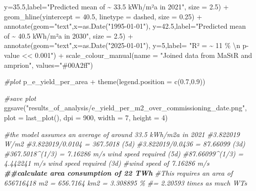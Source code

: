 \documentclass[a4paper,11pt]{article}
\newenvironment{Shaded}{\begin{snugshade}}{\end{snugshade}}
\newcommand{\AttributeTok}[1]{\textcolor[rgb]{0.77,0.63,0.00}{#1}}
\newcommand{\CommentTok}[1]{\textcolor[rgb]{0.56,0.35,0.01}{\textit{#1}}}
\newcommand{\DecValTok}[1]{\textcolor[rgb]{0.00,0.00,0.81}{#1}}
\newcommand{\DocumentationTok}[1]{\textcolor[rgb]{0.56,0.35,0.01}{\textbf{\textit{#1}}}}
\newcommand{\FloatTok}[1]{\textcolor[rgb]{0.00,0.00,0.81}{#1}}
\newcommand{\FunctionTok}[1]{\textcolor[rgb]{0.00,0.00,0.00}{#1}}
\newcommand{\NormalTok}[1]{#1}
\newcommand{\SpecialCharTok}[1]{\textcolor[rgb]{0.00,0.00,0.00}{#1}}
\newcommand{\StringTok}[1]{\textcolor[rgb]{0.31,0.60,0.02}{#1}}
\begin{document}
\begin{Shaded}
\begin{Highlighting}[]
           \AttributeTok{y=}\FloatTok{35.5}\NormalTok{,}\AttributeTok{label=}\StringTok{"Predicted mean of  \textasciitilde{} 33.5 kWh/m²a in 2021"}\NormalTok{, }
           \AttributeTok{size =} \FloatTok{2.5}\NormalTok{) }\SpecialCharTok{+}
  \FunctionTok{geom\_hline}\NormalTok{(}\AttributeTok{yintercept =} \FloatTok{40.5}\NormalTok{, }\AttributeTok{linetype =} \StringTok{\textquotesingle{}dashed\textquotesingle{}}\NormalTok{, }\AttributeTok{size =} \FloatTok{0.25}\NormalTok{) }\SpecialCharTok{+}
  \FunctionTok{annotate}\NormalTok{(}\AttributeTok{geom=}\StringTok{"text"}\NormalTok{,}\AttributeTok{x=}\FunctionTok{as.Date}\NormalTok{(}\StringTok{"1995{-}01{-}01"}\NormalTok{),}
           \AttributeTok{y=}\FloatTok{42.5}\NormalTok{,}\AttributeTok{label=}\StringTok{"Predicted mean of \textasciitilde{} 40.5 kWh/m²a in 2030"}\NormalTok{,}
           \AttributeTok{size =} \FloatTok{2.5}\NormalTok{) }\SpecialCharTok{+}
  \FunctionTok{annotate}\NormalTok{(}\AttributeTok{geom=}\StringTok{"text"}\NormalTok{,}\AttributeTok{x=}\FunctionTok{as.Date}\NormalTok{(}\StringTok{"2025{-}01{-}01"}\NormalTok{),}
           \AttributeTok{y=}\DecValTok{5}\NormalTok{,}\AttributeTok{label=} \StringTok{"R² = \textasciitilde{} 11 \% }\SpecialCharTok{\textbackslash{}n}\StringTok{ p{-}value \textless{}\textless{} 0.001"}\NormalTok{) }\SpecialCharTok{+}
  \FunctionTok{scale\_colour\_manual}\NormalTok{(}\AttributeTok{name =} \StringTok{"Joined data from MaStR and amprion"}\NormalTok{, }
                      \AttributeTok{values=}\StringTok{"\#00A2ff"}\NormalTok{)}

\CommentTok{\#plot}
\NormalTok{p\_e\_yield\_per\_area }\SpecialCharTok{+}  \FunctionTok{theme}\NormalTok{(}\AttributeTok{legend.position =} \FunctionTok{c}\NormalTok{(}\FloatTok{0.7}\NormalTok{,}\FloatTok{0.9}\NormalTok{))}

\CommentTok{\#save plot}
\FunctionTok{ggsave}\NormalTok{(}\StringTok{"results\_of\_analysis/e\_yield\_per\_m2\_over\_commissioning\_date.png"}\NormalTok{,}
       \AttributeTok{plot =} \FunctionTok{last\_plot}\NormalTok{(),}
       \AttributeTok{dpi =} \DecValTok{900}\NormalTok{,}
       \AttributeTok{width =} \DecValTok{7}\NormalTok{,}
       \AttributeTok{height =} \DecValTok{4}\NormalTok{)}


\CommentTok{\#the model assumes an average of around 33.5 kWh/m2a in 2021}
\CommentTok{\#3.822019 W/m2}
\CommentTok{\#3.822019/0.0104 = 367.5018 (5d)}
\CommentTok{\#3.822019/0.0436 = 87.66099 (3d)}
\CommentTok{\#367.5018\^{}(1/3) = 7.16286 m/s wind speed required (5d)}
\CommentTok{\#87.66099\^{}(1/3) = 4.442241 m/s wind speed required (3d)}
\CommentTok{\#wind speed of 7.16286 m/s}
\DocumentationTok{\#\#calculate area consumption of 22 TWh}
\CommentTok{\#This requires an area of 656716418 m2 = 656.7164 km2 = 3.308895 \% }
\CommentTok{\#= 2.20593 times as much WT\textquotesingle{}s}


\end{Highlighting}
\end{Shaded}
\end{document}

